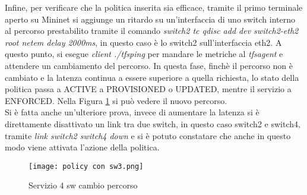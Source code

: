 Infine, per verificare che la politica inserita sia efficace, tramite il primo terminale aperto su Mininet si 
aggiunge un ritardo su un'interfaccia di uno switch interno al percorso prestabilito tramite il comando
\textit{switch2 tc qdisc add dev switch2-eth2 root netem delay 2000ms}, in questo caso è lo switch2 sull'interfaccia eth2.
A questo punto, si esegue \textit{client ./tfsping} per mandare le metriche al \textit{tfsagent} e attendere un cambiamento del percorso.
In questa fase, finchè il percorso non è cambiato e la latenza continua a essere superiore a quella richiesta,
lo stato della politica passa a ACTIVE a PROVISIONED o UPDATED, mentre il servizio a ENFORCED.
Nella Figura \ref{fig:sw4 dopo} si può vedere il nuovo percorso. 
\\Si è fatta anche un'ulteriore prova, invece di aumentare la latenza si è direttamente disattivato un link tra due switch, in questo caso switch2 e switch4,
tramite \textit{link switch2 switch4 down} e si è potuto constatare che anche in questo modo viene attivata l'azione della politica.
\begin{figure}[h]
    \centering
    \texttt{[image: policy con sw3.png]}
    \caption{Servizio 4 sw cambio percorso}
    \label{fig:sw4 dopo}
\end{figure}

